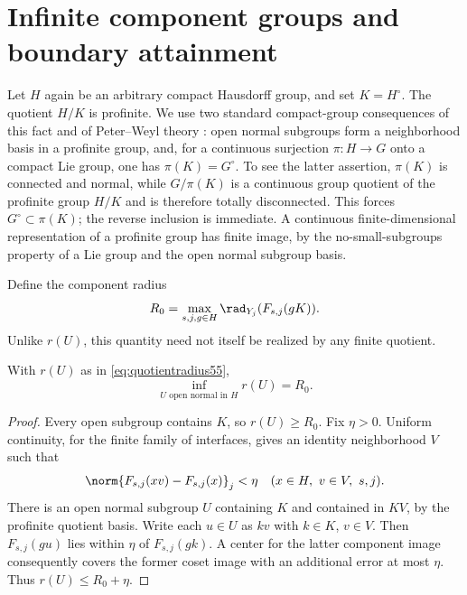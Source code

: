 \section{Infinite component groups and boundary attainment}\label{sec:profinite55}
Let $H$ again be an arbitrary compact Hausdorff group, and set $K=H^\circ$. The quotient $H/K$ is profinite. We use two standard compact-group consequences of this fact and of Peter--Weyl theory \cite{Folland}: open normal subgroups form a neighborhood basis in a profinite group, and, for a continuous surjection $\pi:H\to G$ onto a compact Lie group, one has $\pi(K)=G^\circ$. To see the latter assertion, $\pi(K)$ is connected and normal, while $G/\pi(K)$ is a continuous group quotient of the profinite group $H/K$ and is therefore totally disconnected. This forces $G^\circ\subset\pi(K)$; the reverse inclusion is immediate. A continuous finite-dimensional representation of a profinite group has finite image, by the no-small-subgroups property of a Lie group and the open normal subgroup basis.

Define the component radius
\begin{equation}\label{eq:R055}
                 R_0=\max_{s,j,g\in H}\rad_{Y_j}(F_{s,j}(gK)).
\end{equation}
Unlike $r(U)$, this quantity need not itself be realized by any finite quotient.

\begin{lemma}\label{lem:infradius55}
With $r(U)$ as in \eqref{eq:quotientradius55},
\[
                 \inf_{U\text{ open normal in }H}r(U)=R_0.
\]
\end{lemma}
\begin{proof}
Every open subgroup contains $K$, so $r(U)\ge R_0$. Fix $\eta>0$. Uniform continuity, for the finite family of interfaces, gives an identity neighborhood $V$ such that
\[
 \norm{F_{s,j}(xv)-F_{s,j}(x)}_j<\eta
       \quad(x\in H,\ v\in V,\ s,j).
\]
There is an open normal subgroup $U$ containing $K$ and contained in $KV$, by the profinite quotient basis. Write each $u\in U$ as $kv$ with $k\in K$, $v\in V$. Then $F_{s,j}(gu)$ lies within $\eta$ of $F_{s,j}(gk)$. A center for the latter component image consequently covers the former coset image with an additional error at most $\eta$. Thus $r(U)\le R_0+\eta$.
\end{proof}

